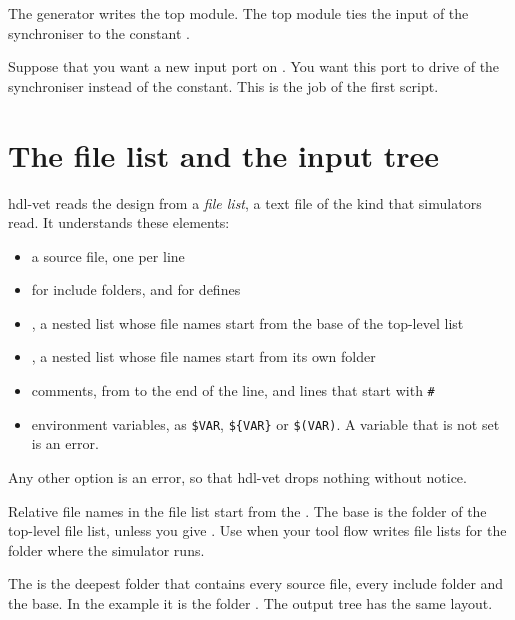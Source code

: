 


The generator writes the top module. The top module ties the input  of the
synchroniser to the constant .



Suppose that you want a new input port  on . You
want this port to drive  of the synchroniser instead of the constant.
This is the job of the first script.

\section{The file list and the input tree}

hdl-vet reads the design from a \emph{file list}, a text file of the kind that
simulators read. It understands these elements:

\begin{itemize}
\item a source file, one per line
\item {} for include folders, and  for defines
\item {}, a nested list whose file names start from the base of the top-level
  list
\item {}, a nested list whose file names start from its own folder
\item comments, from \code{//} to the end of the line, and lines that start with \texttt{\#}
\item environment variables, as \texttt{\$VAR}, \texttt{\$\{VAR\}} or \texttt{\$(VAR)}.
  A variable that is not set is an error.
\end{itemize}

Any other option is an error, so that hdl-vet drops nothing without notice.

Relative file names in the file list start from the . The base is the folder of
the top-level file list, unless you give . Use  when your tool
flow writes file lists for the folder where the simulator runs.

The  is the deepest folder that contains every source file, every
include folder and the base. In the example it is the folder . The output
tree has the same layout.

